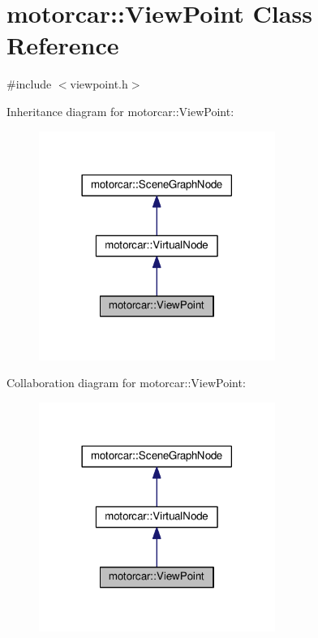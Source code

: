 \hypertarget{classmotorcar_1_1ViewPoint}{\section{motorcar\-:\-:View\-Point Class Reference}
\label{classmotorcar_1_1ViewPoint}
}


{\ttfamily \#include $<$viewpoint.\-h$>$}



Inheritance diagram for motorcar\-:\-:View\-Point\-:
\nopagebreak
\begin{figure}[H]
\begin{center}
\leavevmode
\includegraphics[width=218pt]{classmotorcar_1_1ViewPoint__inherit__graph}
\end{center}
\end{figure}


Collaboration diagram for motorcar\-:\-:View\-Point\-:
\nopagebreak
\begin{figure}[H]
\begin{center}
\leavevmode
\includegraphics[width=218pt]{classmotorcar_1_1ViewPoint__coll__graph}
\end{center}
\end{figure}
